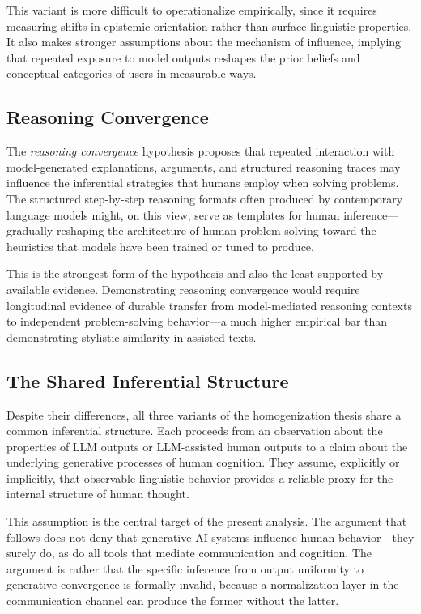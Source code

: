 \documentclass[12pt,a4paper]{article}
\theoremstyle{definition}
\theoremstyle{plain}
\theoremstyle{remark}
\begin{document}
This variant is more difficult to operationalize empirically, since it requires measuring
shifts in epistemic orientation rather than surface linguistic properties. It also makes
stronger assumptions about the mechanism of influence, implying that repeated exposure to
model outputs reshapes the prior beliefs and conceptual categories of users in measurable
ways.

\subsection{Reasoning Convergence}

The \emph{reasoning convergence} hypothesis proposes that repeated interaction with
model-generated explanations, arguments, and structured reasoning traces may influence the
inferential strategies that humans employ when solving problems. The structured step-by-step
reasoning formats often produced by contemporary language models might, on this view, serve
as templates for human inference---gradually reshaping the architecture of human
problem-solving toward the heuristics that models have been trained or tuned to produce.

This is the strongest form of the hypothesis and also the least supported by available
evidence. Demonstrating reasoning convergence would require longitudinal evidence of durable
transfer from model-mediated reasoning contexts to independent problem-solving behavior---a
much higher empirical bar than demonstrating stylistic similarity in assisted texts.

\subsection{The Shared Inferential Structure}

Despite their differences, all three variants of the homogenization thesis share a common
inferential structure. Each proceeds from an observation about the properties of LLM outputs
or LLM-assisted human outputs to a claim about the underlying generative processes of human
cognition. They assume, explicitly or implicitly, that observable linguistic behavior provides
a reliable proxy for the internal structure of human thought.

This assumption is the central target of the present analysis. The argument that follows does
not deny that generative AI systems influence human behavior---they surely do, as do all
tools that mediate communication and cognition. The argument is rather that the specific
inference from output uniformity to generative convergence is formally invalid, because a
normalization layer in the communication channel can produce the former without the latter.
\end{document}
